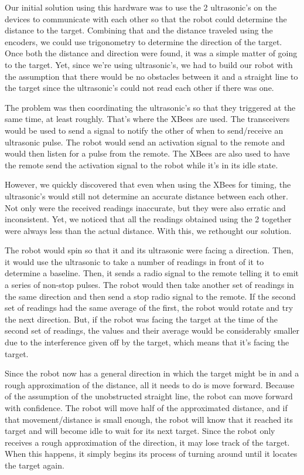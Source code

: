 \documentclass[]{article}
\begin{document}
	Our initial solution using this hardware was to use the 2 ultrasonic's on the devices to communicate with each other so that the robot could determine the distance to the target. Combining that and the distance traveled using the encoders, we could use trigonometry to determine the direction of the target. Once both the distance and direction were found, it was a simple matter of going to the target. Yet, since we're using ultrasonic's, we had to build our robot with the assumption that there would be no obstacles between it and a straight line to the target since the ultrasonic's could not read each other if there was one. 
	
	The problem was then coordinating the ultrasonic's so that they triggered at the same time, at least roughly. That's where the XBees are used. The transceivers would be used to send a signal to notify the other of when to send/receive an ultrasonic pulse. The robot would send an activation signal to the remote and would then listen for a pulse from the remote. The XBees are also used to have the remote send the activation signal to the robot while it's in its idle state. 
	
	However, we quickly discovered that even when using the XBees for timing, the ultrasonic's would still not determine an accurate distance between each other. Not only were the received readings inaccurate, but they were also erratic and inconsistent. Yet, we noticed that all the readings obtained using the 2 together were always less than the actual distance. With this, we rethought our solution. 
	
	The robot would spin so that it and its ultrasonic were facing a direction. Then, it would use the ultrasonic to take a number of readings in front of it to determine a baseline. Then, it sends a radio signal to the remote telling it to emit a series of non-stop pulses. The robot would then take another set of readings in the same direction and then send a stop radio signal to the remote. If the second set of readings had the same average of the first, the robot would rotate and try the next direction. But, if the robot was facing the target at the time of the second set of readings, the values and their average would be considerably smaller due to the interference given off by the target, which means that it's facing the target. 
	
	Since the robot now has a general direction in which the target might be in and a rough approximation of the distance, all it needs to do is move forward. Because of the assumption of the unobstructed straight line, the robot can move forward with confidence. The robot will move half of the approximated distance, and if that movement/distance is small enough, the robot will know that it reached its target and will become idle to wait for its next target. Since the robot only receives a rough approximation of the direction, it may lose track of the target. When this happens, it simply begins its process of turning around until it locates the target again. 
	
\end{document}
